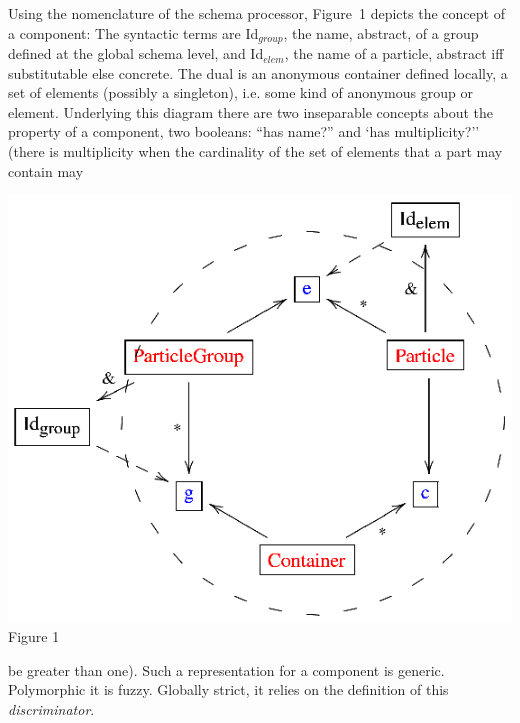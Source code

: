 \noindent
\begin{minipage}[h]{5.2cm}
Using the nomenclature of the schema processor, Figure~1
depicts the concept of a component: 
The syntactic terms are Id$_{group}$, the name, abstract, of a group 
defined at the global schema level, and Id$_{elem}$, the name of a particle,
abstract iff substitutable else concrete. The dual is an anonymous 
container defined locally, a set of 
 elements (possibly a singleton),
i.e. some kind of anonymous group or element. Underlying this diagram there are
two inseparable concepts about the property of a component, two booleans: 
``has name?'' and `has multiplicity?'' (there is multiplicity 
when 
the cardinality of the set of elements that a part may contain may
\end{minipage}
\begin{minipage}[h]{8.8cm}
 \begin{center}
 \includegraphics[]{part8/Viallefond_P52/P52_1.eps}
 \\Figure 1
 \end{center}

\end{minipage}
\hfill
be greater than one). Such a representation for a component is generic. Polymorphic it is fuzzy.
Globally strict, it relies on the definition of this 
{\it discriminator}.


